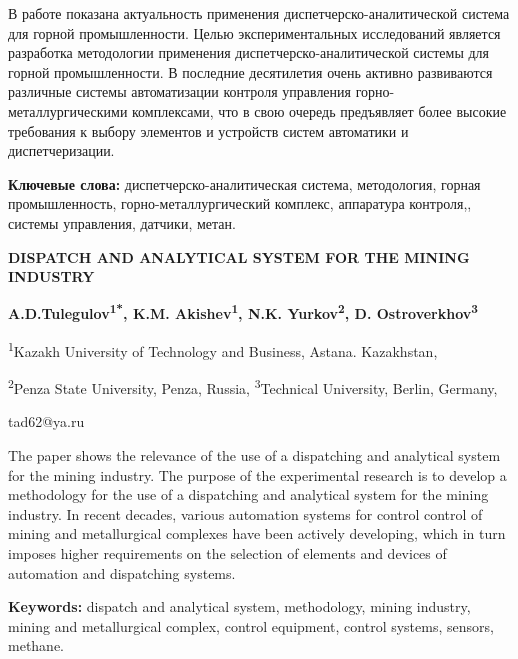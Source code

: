 В работе показана актуальность применения диспетчерско-аналитической
система для горной промышленности. Целью экспериментальных исследований
является разработка методологии применения диспетчерско-аналитической
системы для горной промышленности. В последние десятилетия очень активно
развиваются различные системы автоматизации контроля управления
горно-металлургическими комплексами, что в свою очередь предъявляет
более высокие требования к выбору элементов и устройств систем
автоматики и диспетчеризации.

{\bfseries Ключевые слова:} диспетчерско-аналитическая система,
методология, горная промышленность, горно-металлургический комплекс,
аппаратура контроля,, системы управления, датчики, метан.

\begin{center}
{\large\bfseries DISPATCH AND ANALYTICAL SYSTEM FOR THE MINING INDUSTRY}

{\bfseries A.D.Tulegulov\textsuperscript{1*}, K.M.
Akishev\textsuperscript{1}, N.K. Yurkov\textsuperscript{2}, D.
Ostroverkhov\textsuperscript{3}}

\textsuperscript{1}Kazakh University of Technology and Business, Astana.
Kazakhstan,

\textsuperscript{2}Penza State University, Penza, Russia,
\textsuperscript{3}Technical University, Berlin, Germany,

tad62@ya.ru
\end{center}

The paper shows the relevance of the use of a dispatching and analytical
system for the mining industry. The purpose of the experimental research
is to develop a methodology for the use of a dispatching and analytical
system for the mining industry. In recent decades, various automation
systems for control control of mining and metallurgical complexes have
been actively developing, which in turn imposes higher requirements on
the selection of elements and devices of automation and dispatching
systems.

{\bfseries Keywords:} dispatch and analytical system, methodology, mining
industry, mining and metallurgical complex, control equipment, control
systems, sensors, methane.

